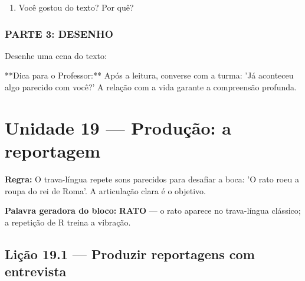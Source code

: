 \begin{exercicio}
\begin{enumerate}
  \item Você gostou do texto? Por quê?
  \begin{center}
  \underline{\hspace{12cm}}
  \end{center}

\end{enumerate}

\subsection*{PARTE 3: DESENHO}

Desenhe uma cena do texto:

\begin{center}
\end{center}

\end{exercicio}

\begin{dica}
**Dica para o Professor:** Após a leitura, converse com a turma: 'Já aconteceu algo parecido com você?' A relação com a vida garante a compreensão profunda.
\end{dica}


\chapter{Unidade 19 --- Produção: a reportagem}


\textbf{Regra:} O trava-língua repete sons parecidos para desafiar a boca: 'O rato roeu a roupa do rei de Roma'. A articulação clara é o objetivo.

\textbf{Palavra geradora do bloco:} \textbf{RATO} --- o rato aparece no trava-língua clássico; a repetição de R treina a vibração.

\section{Lição 19.1 --- Produzir reportagens com entrevista}

